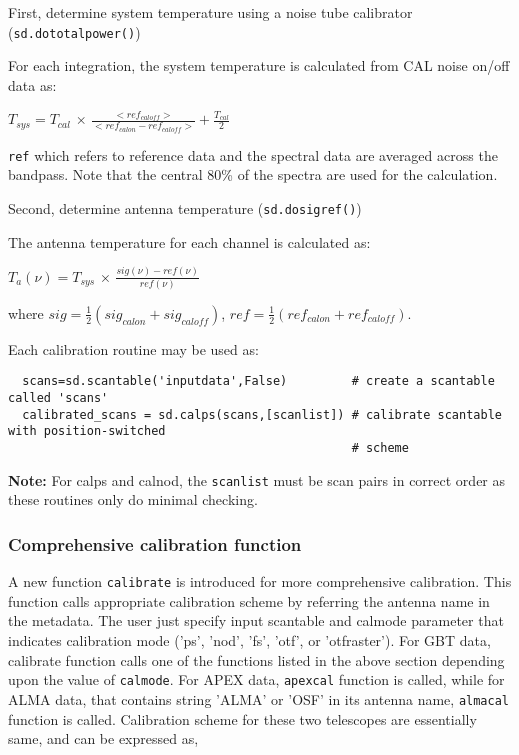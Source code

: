 First, determine system temperature using a noise tube calibrator
({\tt sd.dototalpower()}) 

For each integration, the system temperature is calculated from
CAL noise on/off data as:

$ T_{sys} = T_{cal}$ $\times$ 
$\frac{<ref_{caloff}>}{<ref_{calon} - ref_{caloff}>} + \frac{T_{cal}}{2} $

{\tt ref} which refers to reference data and the spectral data are averaged
across the bandpass.  Note that the central 80\% of the spectra are
used for the calculation.

Second, determine antenna temperature ({\tt sd.dosigref()})

The antenna temperature for each channel is calculated as:

$ T_a(\nu) = T_{sys}$ $\times$ 
$\frac{sig(\nu) - ref(\nu)}{ref(\nu)}$

where $sig = \frac{1}{2}(sig_{calon} + sig_{caloff})$, 
      $ref = \frac{1}{2}(ref_{calon} + ref_{caloff}).$


Each calibration routine may be used as:


\small
\begin{verbatim}
  scans=sd.scantable('inputdata',False)         # create a scantable called 'scans'
  calibrated_scans = sd.calps(scans,[scanlist]) # calibrate scantable with position-switched 
                                                # scheme
\end{verbatim}
\normalsize


{\bf Note:} For calps and calnod, the {\tt scanlist} must be scan pairs in
correct order as these routines only do minimal checking.

\subsubsection{Comprehensive calibration function}
A new function {\tt calibrate} is introduced for more comprehensive
calibration. This function calls appropriate calibration scheme by
referring the antenna name in the metadata. The user just specify input
scantable and calmode parameter that indicates calibration mode ('ps',
'nod', 'fs', 'otf', or 'otfraster'). For GBT data, calibrate function calls one of
the functions listed in the above section depending upon the value of
{\tt calmode}. For APEX data, {\tt apexcal} function is called, while for ALMA
data, that contains string 'ALMA' or 'OSF' in its antenna name, {\tt almacal}
function is called. Calibration scheme for these two telescopes are
essentially same, and can be expressed as,


